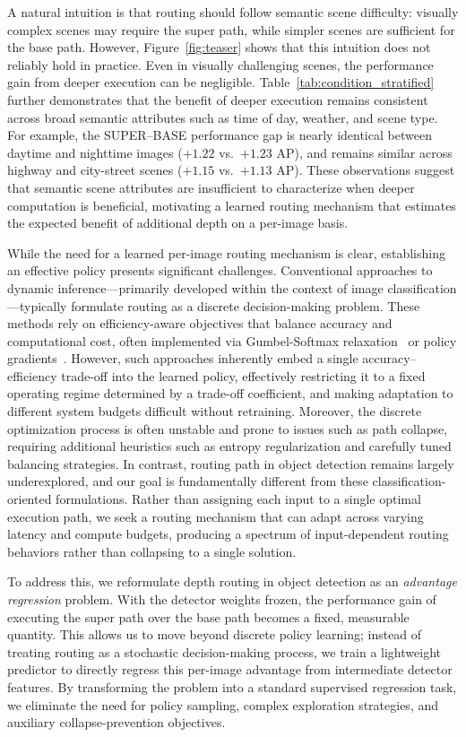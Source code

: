 A natural intuition is that routing should follow semantic scene difficulty: visually complex scenes may require the super path, while simpler scenes are sufficient for the base path. 
However, Figure~\ref{fig:teaser} shows that this intuition does not reliably hold in practice. 
Even in visually challenging scenes, the performance gain from deeper execution can be negligible. 
Table~\ref{tab:condition_stratified} further demonstrates that the benefit of deeper execution remains consistent across broad semantic attributes such as time of day, weather, and scene type. 
For example, the SUPER--BASE performance gap is nearly identical between daytime and nighttime images ($+1.22$ vs.\ $+1.23$ AP), and remains similar across highway and city-street scenes ($+1.15$ vs.\ $+1.13$ AP). 
These observations suggest that semantic scene attributes are insufficient to characterize when deeper computation is beneficial, motivating a learned routing mechanism that estimates the expected benefit of additional depth on a per-image basis.


While the need for a learned per-image routing mechanism is clear, establishing an effective policy presents significant challenges. 
Conventional approaches to dynamic inference—primarily developed within the context of image classification—typically formulate routing as a discrete decision-making problem. 
These methods rely on efficiency-aware objectives that balance accuracy and computational cost, often implemented via Gumbel-Softmax relaxation~\cite{guo2019spottune, meng2020ar} or policy gradients~\cite{wu2018blockdrop}.
However, such approaches inherently embed a single accuracy–efficiency trade-off into the learned policy, effectively restricting it to a fixed operating regime determined by a trade-off coefficient, and making adaptation to different system budgets difficult without retraining. 
Moreover, the discrete optimization process is often unstable and prone to issues such as path collapse, requiring additional heuristics such as entropy regularization and carefully tuned balancing strategies. 
In contrast, routing path in object detection remains largely underexplored, and our goal is fundamentally different from these classification-oriented formulations. 
Rather than assigning each input to a single optimal execution path, we seek a routing mechanism that can adapt across varying latency and compute budgets, producing a spectrum of input-dependent routing behaviors rather than collapsing to a single solution.


To address this, we reformulate depth routing in object detection as an \emph{advantage regression} problem. With the detector weights frozen, the performance gain of executing the super path over the base path becomes a fixed, measurable quantity. 
This allows us to move beyond discrete policy learning; instead of treating routing as a stochastic decision-making process, we train a lightweight predictor to directly regress this per-image advantage from intermediate detector features. 
By transforming the problem into a standard supervised regression task, we eliminate the need for policy sampling, complex exploration strategies, and auxiliary collapse-prevention objectives.


